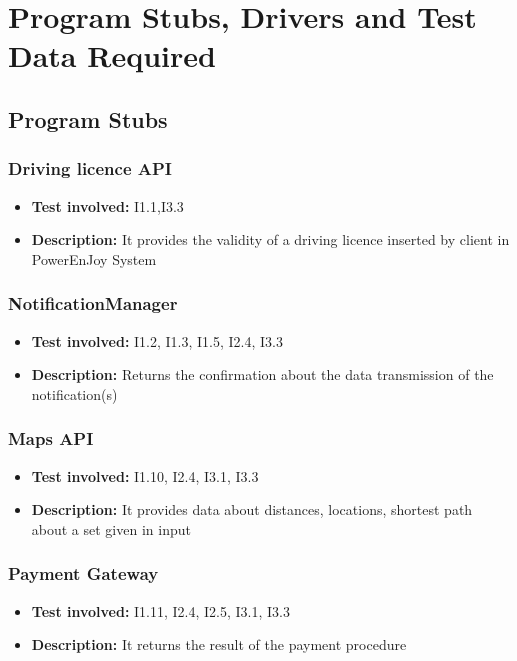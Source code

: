\chapter{Program Stubs, Drivers and Test Data Required}

\section{Program Stubs}

\subsection{Driving licence API}
\begin{itemize}
\item \textbf{Test involved:} I1.1,I3.3
\item \textbf{Description:} It provides the validity of a driving licence inserted by client in PowerEnJoy System
\end{itemize}

\subsection{NotificationManager}
\begin{itemize}
\item \textbf{Test involved:} I1.2, I1.3, I1.5, I2.4, I3.3
\item \textbf{Description:} Returns the confirmation about the data transmission of the notification(s)
\end{itemize}

\subsection{Maps API}
\begin{itemize}
\item \textbf{Test involved:} I1.10, I2.4, I3.1, I3.3
\item \textbf{Description:} It provides data about distances, locations, shortest path about a set given in input
\end{itemize}

\subsection{Payment Gateway}
\begin{itemize}
\item \textbf{Test involved:} I1.11, I2.4, I2.5, I3.1, I3.3
\item \textbf{Description:} It returns the result of the payment procedure
\end{itemize}

